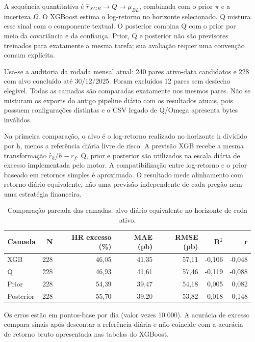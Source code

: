 A sequência quantitativa é $\widehat r_{XGB}\rightarrow Q\rightarrow\mu_{BL}$, combinada com o prior $\pi$ e a incerteza $\Omega$. O XGBoost estima o log-retorno no horizonte selecionado. Q mistura esse sinal com o componente textual. O posterior combina Q com o prior por meio da covariância e da confiança. Prior, Q e posterior não são previsores treinados para exatamente a mesma tarefa; sua avaliação requer uma convenção comum explícita.

Usa-se a auditoria da rodada mensal atual: 240 pares ativo-data candidatos e 228 com alvo concluído até 30/12/2025. Foram excluídos 12 pares sem desfecho elegível. Todas as camadas são comparadas exatamente nos mesmos pares. Não se misturam os exports do antigo pipeline diário com os resultados atuais, pois possuem configurações distintas e o CSV legado de Q/Omega apresenta bytes inválidos.

Na primeira comparação, o alvo é o log-retorno realizado no horizonte h dividido por h, menos a referência diária livre de risco. A previsão XGB recebe a mesma transformação $\widehat r_h/h-r_f$. Q, prior e posterior são utilizados na escala diária de excesso implementada pelo motor. A compatibilização entre log-retorno e o prior baseado em retornos simples é aproximada. O resultado mede alinhamento com retorno diário equivalente, não uma previsão independente de cada pregão nem uma estratégia financeira.

\begin{table}[H]\centering
\caption{Comparação pareada das camadas: alvo diário equivalente no horizonte de cada ativo.}
{\footnotesize\begin{tabular}{lrrrrrr}\hline
Camada & N & HR excesso (\%) & MAE (pb) & RMSE (pb) & R$^2$ & r\\ \hline
XGB & 228 & 46,05 & 41,35 & 57,11 & -0,106 & -0,048\\
Q & 228 & 46,93 & 41,61 & 57,46 & -0,119 & -0,088\\
Prior & 228 & 54,39 & 39,47 & 54,18 & 0,005 & 0,082\\
Posterior & 228 & 55,70 & 39,20 & 53,82 & 0,018 & 0,148\\
\hline\end{tabular}}\par{}\end{table}

Os erros estão em pontos-base por dia (valor vezes 10.000). A acurácia de excesso compara sinais após descontar a referência diária e não coincide com a acurácia de retorno bruto apresentada nas tabelas do XGBoost.

